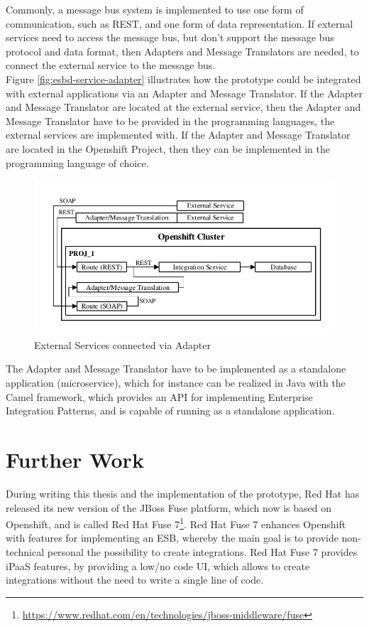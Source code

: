 Commonly, a message bus system is implemented to use one form of communication, such as REST, and one form of data representation. If external services need to access the message bus, but don't support the message bus protocol and data format, then Adapters and Message Translators are needed, to connect the external service to the message bus. \\

Figure \vref{fig:esbd-service-adapter} illustrates how the prototype could be integrated with external applications via an Adapter and Message Translator. If the Adapter and Message Translator are located at the external service, then the Adapter and Message Translator have to be provided in the programming languages, the external services are implemented with. If the Adapter and Message Translator are located in the Openshift Project, then they can be implemented in the programming language of choice.

\begin{figure}[htbp]
	\centering
	\includegraphics[scale=1]{images/esbd-service-adapter.pdf}
	\caption{External Services connected via Adapter}
	\label{fig:esbd-service-adapter}
\end{figure}

The Adapter and Message Translator have to be implemented as a standalone application (microservice), which for instance can be realized in Java with the Camel framework, which provides an API for implementing Enterprise Integration Patterns, and is capable of running as a standalone application. \\

\section{Further Work}
\label{sec:esbd-furhter-work}
During writing this thesis and the implementation of the prototype, Red Hat has released its new version of the JBoss Fuse platform, which now is based on Openshift, and is called Red Hat Fuse 7\footnote{\url{https://www.redhat.com/en/technologies/jboss-middleware/fuse}}. Red Hat Fuse 7 enhances Openshift with features for implementing an ESB, whereby the main goal is to provide non-technical personal the possibility to create integrations. Red Hat Fuse 7 provides iPaaS features, by providing a low/no code UI, which allows to create integrations without the need to write a single line of code. \\

